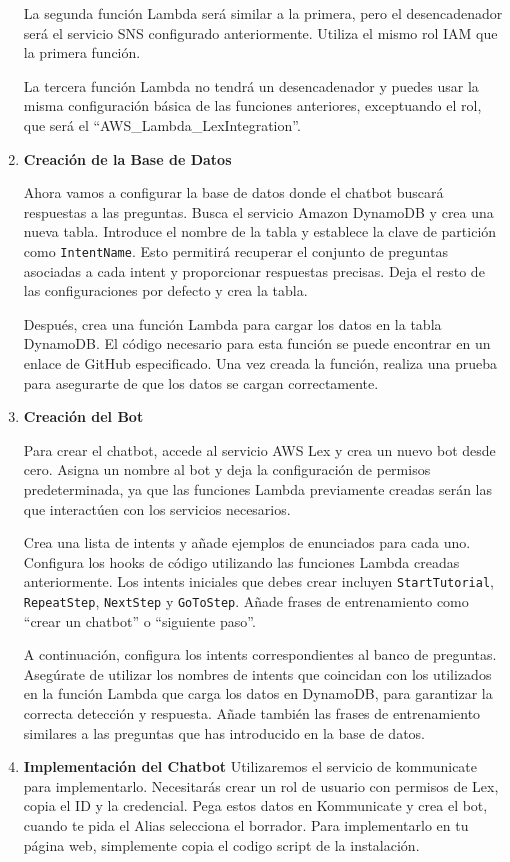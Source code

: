\begin{enumerate}
La segunda función Lambda será similar a la primera, pero el desencadenador será el servicio SNS configurado anteriormente. Utiliza el mismo rol IAM que la primera función.

La tercera función Lambda no tendrá un desencadenador y puedes usar la misma configuración básica de las funciones anteriores, exceptuando el rol, que será el “AWS\_Lambda\_LexIntegration”.

\item \textbf{Creación de la Base de Datos}

Ahora vamos a configurar la base de datos donde el chatbot buscará respuestas a las preguntas. Busca el servicio Amazon DynamoDB y crea una nueva tabla. Introduce el nombre de la tabla y establece la clave de partición como \texttt{IntentName}. Esto permitirá recuperar el conjunto de preguntas asociadas a cada intent y proporcionar respuestas precisas. Deja el resto de las configuraciones por defecto y crea la tabla.

Después, crea una función Lambda para cargar los datos en la tabla DynamoDB. El código necesario para esta función se puede encontrar en un enlace de GitHub especificado. Una vez creada la función, realiza una prueba para asegurarte de que los datos se cargan correctamente.

\item \textbf{Creación del Bot}

Para crear el chatbot, accede al servicio AWS Lex y crea un nuevo bot desde cero. Asigna un nombre al bot y deja la configuración de permisos predeterminada, ya que las funciones Lambda previamente creadas serán las que interactúen con los servicios necesarios.

Crea una lista de intents y añade ejemplos de enunciados para cada uno. Configura los hooks de código utilizando las funciones Lambda creadas anteriormente. Los intents iniciales que debes crear incluyen \texttt{StartTutorial}, \texttt{RepeatStep}, \texttt{NextStep} y \texttt{GoToStep}. Añade frases de entrenamiento como “crear un chatbot” o “siguiente paso”.

A continuación, configura los intents correspondientes al banco de preguntas. Asegúrate de utilizar los nombres de intents que coincidan con los utilizados en la función Lambda que carga los datos en DynamoDB, para garantizar la correcta detección y respuesta. Añade también las frases de entrenamiento similares a las preguntas que has introducido en la base de datos.

\item \textbf{Implementación del Chatbot}
Utilizaremos el servicio de kommunicate para implementarlo. Necesitarás crear un rol de usuario con permisos de Lex, copia el ID y la credencial. Pega estos datos en Kommunicate y crea el bot, cuando te pida el Alias selecciona el borrador. 
Para implementarlo en tu página web, simplemente copia el codigo script de la instalación.

\end{enumerate}


